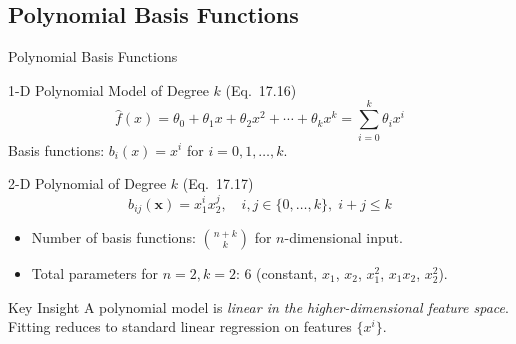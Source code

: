 \documentclass[aspectratio=169,10pt]{beamer}
\newcommand{\vx}{\mathbf{x}}
\newcommand{\hatf}{\hat{f}}
\begin{document}
\subsection{Polynomial Basis Functions}

\begin{frame}{Polynomial Basis Functions}
  \begin{block}{1-D Polynomial Model of Degree $k$ (Eq.\ 17.16)}
    \[
      \hatf(x) = \theta_0 + \theta_1 x + \theta_2 x^2 + \cdots + \theta_k x^k
               = \sum_{i=0}^{k}\theta_i x^i
    \]
    Basis functions: $b_i(x) = x^i$ for $i = 0, 1, \ldots, k$.
  \end{block}

  \begin{block}{2-D Polynomial of Degree $k$ (Eq.\ 17.17)}
    \[
      b_{ij}(\vx) = x_1^i x_2^j, \quad i,j \in \{0,\ldots,k\},\; i+j \le k
    \]
    \begin{itemize}
      \item Number of basis functions: $\binom{n+k}{k}$ for $n$-dimensional input.
      \item Total parameters for $n=2, k=2$: 6 (constant, $x_1$, $x_2$, $x_1^2$, $x_1 x_2$, $x_2^2$).
    \end{itemize}
  \end{block}

  \begin{exampleblock}{Key Insight}
    A polynomial model is \emph{linear in the higher-dimensional feature space}.
    Fitting reduces to standard linear regression on features $\{x^i\}$.
  \end{exampleblock}
\end{frame}
\end{document}
